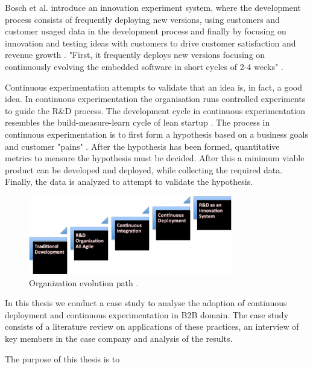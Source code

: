 \documentclass[english]{tktltiki2}
\theoremstyle{definition}
\theoremstyle{remark}
\begin{document}
Bosch et al. introduce an innovation experiment system, where the development process consists of frequently deploying new versions, using customers and customer usaged data in the development process and finally by focusing on innovation and testing ideas with customers to drive customer satisfaction and revenue growth \cite{bosch2012building}. "First, it frequently deploys new versions focusing on continuously evolving the embedded software in short cycles of 2-4 weeks" \cite{eklund2012architecture}.

Continuous experimentation attempts to validate that an idea is, in fact, a good idea. In continuous experimentation the organisation runs controlled experiments to guide the R\&D process. The development cycle in continuous experimentation resembles the build-measure-learn cycle of lean startup \cite{ries2011lean}. The process in continuous experimentation is to first form a hypothesis based on a business goals and customer "pains" \cite{bosch2012building}. After the hypothesis has been formed, quantitative metrics to measure the hypothesis must be decided. After this a minimum viable product can be developed and deployed, while collecting the required data. Finally, the data is analyzed to attempt to validate the hypothesis.


\begin{figure}[h]
	\centering
	\includegraphics[width=3.5in]{stairway.png}
	\caption{Organization evolution path \cite{olsson2012climbing}.}
\end{figure}

In this thesis we conduct a case study to analyse the adoption of continuous deployment and continuous experimentation in B2B domain. The case study consists of a literature review on applications of these practices, an interview of key members in the case company and analysis of the results. 

The purpose of this thesis is to
\end{document}
